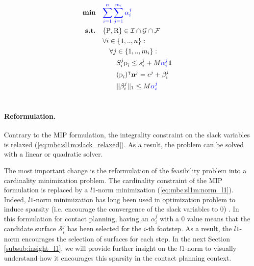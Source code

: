 \begin{align}
    \textrm{\textbf{min}}  \quad & \textcolor{blue}{\sum_{i=1}^{n} \sum_{j=1}^{m_i} \alpha_i^j} \label{eq:mbc:sl1m:norm_l1}\\
    \textrm{\textbf{s.t.}}  \quad & \{\mbox{P},\mbox{R}\} \in \mathcal{I} \cap \mathcal{G} \cap \mathcal{F} \nonumber\\
                            \quad & \forall i \in \{1,..,n\} : \nonumber\\
                                \quad & \quad \forall j \in \{1,..,m_i\} : \nonumber\\
                                    \quad & \quad \quad S_i^j\mbox{p}_i \leq s_i^j + M \textcolor{blue}{\alpha_i^j} \textbf{1} \nonumber\\
                                    \quad & \quad \quad (\mbox{p}_i)^{\intercal} \textbf{n}^j = e^j + \beta_i^j \nonumber\\
                                    \quad & \quad \quad ||\beta_i^j||_1 \leq M \textcolor{blue}{\alpha_i^j} \nonumber\\
                                    \nonumber
\end{align}
\paragraph{Reformulation.}
Contrary to the MIP formulation, the integrality constraint on the slack variables is relaxed (\ref{eq:mbc:sl1m:slack_relaxed}). 
As a result, the problem can be solved with a linear or quadratic solver.

The most important change is the reformulation of the feasibility problem into a cardinality minimization problem. The cardinality constraint of the MIP formulation is replaced by a $l1$-norm minimization (\ref{eq:mbc:sl1m:norm_l1}).
Indeed, $l1$-norm minimization has long been used in optimization problem to induce sparsity (i.e. encourage the convergence of the slack variables to 0) \cite{boyd2004convex}. 
In this formulation for contact planning, having an $\alpha_i^j$ with a 0 value means that the candidate surface $\mathcal{S}_i^j$ has been selected for the $i$-th footstep. 
As a result, the $l1$-norm encourages the selection of surfaces for each step.
In the next Section \ref{subsub:insight_l1}, we will provide further insight on the $l1$-norm to visually understand how it encourages this sparsity in the contact planning context.



